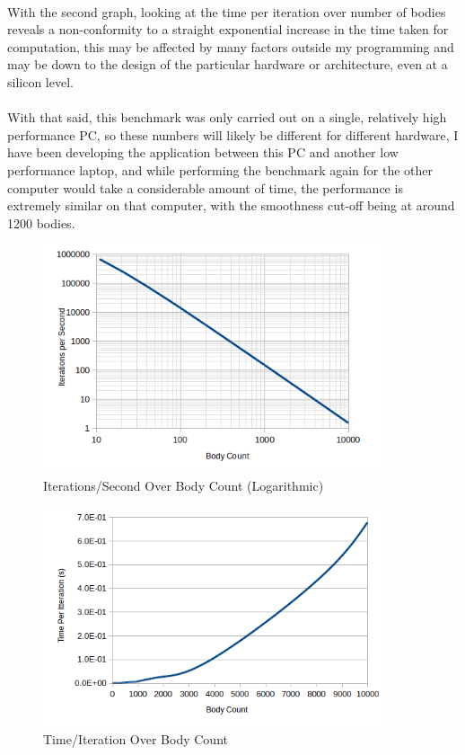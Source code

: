 \paragraph{}
With the second graph, looking at the time per iteration over number of bodies reveals a non-conformity to a straight exponential increase in the time taken for computation, this may be affected by many factors outside my programming and may be down to the design of the particular hardware or architecture, even at a silicon level.

\paragraph{}
With that said, this benchmark was only carried out on a single, relatively high performance PC, so these numbers will likely be different for different hardware, I have been developing the application between this PC and another low performance laptop, and while performing the benchmark again for the other computer would take a considerable amount of time, the performance is extremely similar on that computer, with the smoothness cut-off being at around 1200 bodies.

\begin{figure}[ht]
  \centering
  \includegraphics[width=0.9\textwidth]{img/testingEvidence/perfgraph.png}
  \caption{Iterations/Second Over Body Count (Logarithmic)}
\end{figure}

\begin{figure}[!h]
  \centering
  \includegraphics[width=0.9\textwidth]{img/testingEvidence/perftesttpi.png}
  \caption{Time/Iteration Over Body Count}
\end{figure}

\pagebreak